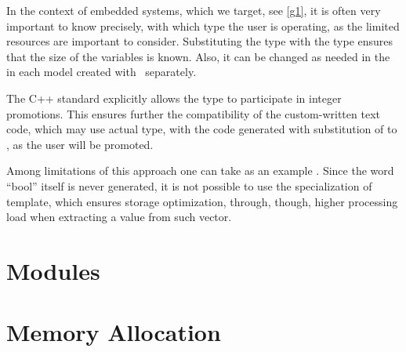 In the context of embedded systems, which we target, see \ref{g1}, it is often very important to 
know precisely, with which type the user is operating, as the limited resources
are important to consider. Substituting the  type with the  type ensures that the size of the  variables is known.
Also, it can be changed as needed in the  in each model created with \mb\ separately.

The C++ standard explicitly allows the  type to participate in integer promotions. This ensures further the compatibility of the custom-written
text code, which may use actual  type, with the code generated with substitution of  to , as the user  will be promoted.

Among limitations of this approach one can take as an example . Since the word ``bool'' itself is never generated, 
it is not possible to use the specialization of template, which ensures storage optimization, through, though, higher processing load when
extracting a value from such vector.

\section{Modules}


\section{Memory Allocation}







%
%








